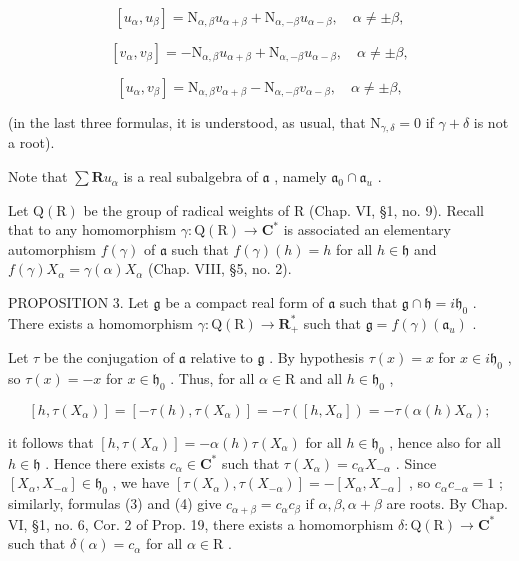 \[
[ u _ {\alpha}, u _ {\beta} ] = \mathrm{N} _ {\alpha , \beta} u _ {\alpha + \beta} + \mathrm{N} _ {\alpha , - \beta} u _ {\alpha - \beta}, \quad \alpha \neq \pm \beta ,\tag{10}
\]

\[
[ v _ {\alpha}, v _ {\beta} ] = - \mathrm{N} _ {\alpha , \beta} u _ {\alpha + \beta} + \mathrm{N} _ {\alpha , - \beta} u _ {\alpha - \beta}, \quad \alpha \neq \pm \beta ,\tag{11}
\]

\[
[ u _ {\alpha}, v _ {\beta} ] = \mathrm{N} _ {\alpha , \beta} v _ {\alpha + \beta} - \mathrm{N} _ {\alpha , - \beta} v _ {\alpha - \beta}, \quad \alpha \neq \pm \beta ,\tag{12}
\]

(in the last three formulas, it is understood, as usual, that \(\mathrm{N}_{\gamma, \delta} = 0\) if \(\gamma + \delta\) is not a root).

Note that \(\sum \mathbf{R}u_{\alpha}\) is a real subalgebra of \(\mathfrak{a}\) , namely \(\mathfrak{a}_0 \cap \mathfrak{a}_u\) .

Let \(\mathrm{Q}(\mathrm{R})\) be the group of radical weights of R (Chap. VI, §1, no. 9). Recall that to any homomorphism \(\gamma : \mathrm{Q}(\mathrm{R}) \to \mathbf{C}^*\) is associated an elementary automorphism \(f(\gamma)\) of \(\mathfrak{a}\) such that \(f(\gamma)(h) = h\) for all \(h \in \mathfrak{h}\) and \(f(\gamma)X_{\alpha} = \gamma(\alpha)X_{\alpha}\) (Chap. VIII, §5, no. 2).

PROPOSITION 3. Let \(\mathfrak{g}\) be a compact real form of \(\mathfrak{a}\) such that \(\mathfrak{g} \cap \mathfrak{h} = i\mathfrak{h}_0\) . There exists a homomorphism \(\gamma: \mathrm{Q}(\mathrm{R}) \to \mathbf{R}_{+}^{*}\) such that \(\mathfrak{g} = f(\gamma)(\mathfrak{a}_u)\) .

Let \(\tau\) be the conjugation of \(\mathfrak{a}\) relative to \(\mathfrak{g}\) . By hypothesis \(\tau(x) = x\) for \(x \in i\mathfrak{h}_0\) , so \(\tau(x) = -x\) for \(x \in \mathfrak{h}_0\) . Thus, for all \(\alpha \in \mathrm{R}\) and all \(h \in \mathfrak{h}_0\) ,

\[
[ h, \tau (X _ {\alpha}) ] = [ - \tau (h), \tau (X _ {\alpha}) ] = - \tau ([ h, X _ {\alpha} ]) = - \tau (\alpha (h) X _ {\alpha});
\]

it follows that \([h, \tau(X_{\alpha})] = -\alpha(h)\tau(X_{\alpha})\) for all \(h \in \mathfrak{h}_0\) , hence also for all \(h \in \mathfrak{h}\) . Hence there exists \(c_{\alpha} \in \mathbf{C}^*\) such that \(\tau(X_{\alpha}) = c_{\alpha}X_{-\alpha}\) . Since \([X_{\alpha}, X_{-\alpha}] \in \mathfrak{h}_0\) , we have \([\tau(X_{\alpha}), \tau(X_{-\alpha})] = -[X_{\alpha}, X_{-\alpha}]\) , so \(c_{\alpha}c_{-\alpha} = 1\) ; similarly, formulas (3) and (4) give \(c_{\alpha + \beta} = c_{\alpha}c_{\beta}\) if \(\alpha, \beta, \alpha + \beta\) are roots. By Chap. VI, §1, no. 6, Cor. 2 of Prop. 19, there exists a homomorphism \(\delta: \mathrm{Q}(\mathrm{R}) \to \mathbf{C}^*\) such that \(\delta(\alpha) = c_{\alpha}\) for all \(\alpha \in \mathrm{R}\) .

